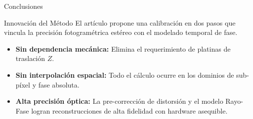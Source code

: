 \documentclass[aspectratio=169]{beamer}
\begin{document}
	\begin{frame}{Conclusiones}
		\begin{block}{Innovación del Método}
			El artículo propone una calibración en dos pasos que vincula la precisión fotogramétrica estéreo con el modelado temporal de fase.
		\end{block}
		\vspace{0.3cm}
		\begin{itemize}
			\item \textbf{Sin dependencia mecánica:} Elimina el requerimiento de platinas de traslación $Z$.
			\item \textbf{Sin interpolación espacial:} Todo el cálculo ocurre en los dominios de sub-píxel y fase absoluta.
			\item \textbf{Alta precisión óptica:} La pre-corrección de distorsión y el modelo Rayo-Fase logran reconstrucciones de alta fidelidad con hardware asequible.
		\end{itemize}
	\end{frame}
	
\end{document}
